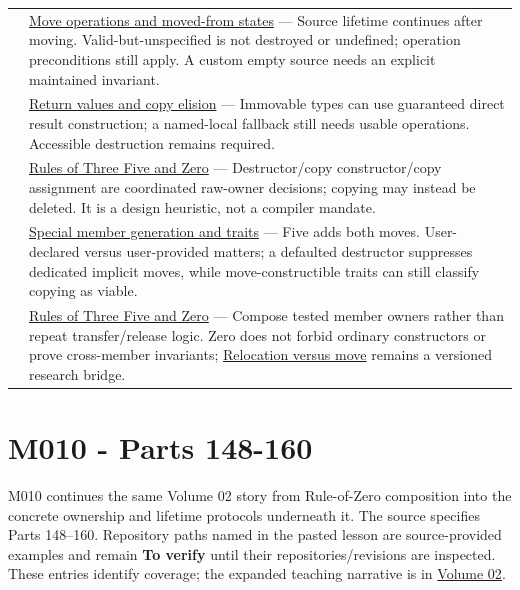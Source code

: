 {\begin{longtable}[]{@{}
  >{\raggedright\arraybackslash}p{}
  >{\raggedright\arraybackslash}p{}@{}}
143 & \hyperref[appendix-5636651017c2]{Move operations and moved-from states} --- Source lifetime continues after moving. Valid-but-unspecified is not destroyed or undefined; operation preconditions still apply. A custom empty source needs an explicit maintained invariant. \\
144 & \hyperref[appendix-b08d3788c5c6]{Return values and copy elision} --- Immovable types can use guaranteed direct result construction; a named-local fallback still needs usable operations. Accessible destruction remains required. \\
145 & \hyperref[appendix-7679107d057e]{Rules of Three Five and Zero} --- Destructor/copy constructor/copy assignment are coordinated raw-owner decisions; copying may instead be deleted. It is a design heuristic, not a compiler mandate. \\
146 & \hyperref[appendix-42e02a12c694]{Special member generation and traits} --- Five adds both moves. User-declared versus user-provided matters; a defaulted destructor suppresses dedicated implicit moves, while move-constructible traits can still classify copying as viable. \\
147 & \hyperref[appendix-7679107d057e]{Rules of Three Five and Zero} --- Compose tested member owners rather than repeat transfer/release logic. Zero does not forbid ordinary constructors or prove cross-member invariants; \hyperref[appendix-adfd6397af8d]{Relocation versus move} remains a versioned research bridge. \\
\end{longtable}
}

\section{M010 - Parts 148-160}\label{appendix-fd090d982a15-m010---parts-148-160}

M010 continues the same Volume 02 story from Rule-of-Zero composition into the concrete ownership and lifetime protocols underneath it. The source specifies Parts 148--160. Repository paths named in the pasted lesson are source-provided examples and remain \textbf{To verify} until their repositories/revisions are inspected. These entries identify coverage; the expanded teaching narrative is in \href{Continuous\%20Notes/Computing\%20Foundations\%20-\%20From\%20Bits\%20to\%20C++\%20and\%20Systems\%20APIs\#From\%20a\%20live\%20object\%20to\%20responsible\%20resource\%20ownership}{Volume 02}.

